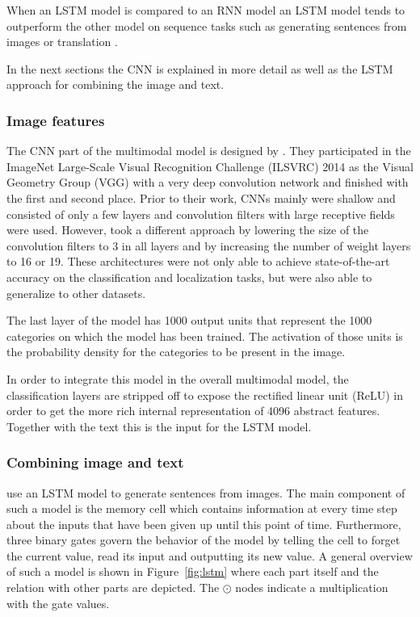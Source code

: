 When an LSTM model is compared to an RNN model an LSTM model tends to outperform the other model on sequence tasks such as generating sentences from images or translation \cite{vinyals2014show}. 

In the next sections the CNN is explained in more detail as well as the LSTM approach for combining the image and text.

\subsubsection{Image features}
The CNN part of the multimodal model is designed by \citeauthor{simonyan2014very}. They participated in the ImageNet Large-Scale Visual Recognition Challenge (ILSVRC) 2014 as the Visual Geometry Group (VGG) with a very deep convolution network and finished with the first and second place. Prior to their work, CNNs mainly were shallow and consisted of only a few layers and convolution filters with large receptive fields were used. However, \citeauthor{simonyan2014very} took a different approach by lowering the size of the convolution filters to 3 in all layers and by increasing the number of weight layers to 16 or 19. These architectures were not only able to achieve state-of-the-art accuracy on the classification and localization tasks, but were also able to generalize to other datasets.

The last layer of the model has 1000 output units that represent the 1000 categories on which the model has been trained. The activation of those units is the probability density for the categories to be present in the image. 

In order to integrate this model in the overall multimodal model, the classification layers are stripped off to expose the rectified linear unit (ReLU) in order to get the more rich internal representation of 4096 abstract features. Together with the text this is the input for the LSTM model.

\subsubsection{Combining image and text}
\citeauthor{vinyals2014show} use an LSTM model to generate sentences from images. The main component of such a model is the memory cell which contains information at every time step about the inputs that have been given up until this point of time. Furthermore, three binary gates govern the behavior of the model by telling the cell to forget the current value, read its input and outputting its new value. A general overview of such a model is shown in Figure~\ref{fig:lstm} where each part itself and the relation with other parts are depicted. The $\odot$ nodes indicate a multiplication with the gate values.

